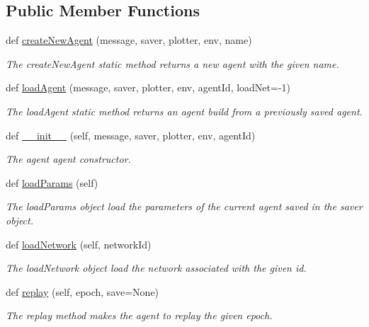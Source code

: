 \subsection*{Public Member Functions}
\begin{DoxyCompactItemize}
\item 
def \hyperlink{classDQN-Deepmind-NIPS-2013_1_1agent_1_1DeepMindAgent_1_1DeepMindAgent_a9ea279d64a3b2bced6901c55df78c7e4}{create\+New\+Agent} (message, saver, plotter, env, name)
\begin{DoxyCompactList}\small\item\em The create\+New\+Agent static method returns a new agent with the given name. \end{DoxyCompactList}\item 
def \hyperlink{classDQN-Deepmind-NIPS-2013_1_1agent_1_1DeepMindAgent_1_1DeepMindAgent_ada9bf3a5f6669e9fbde8d6527511685d}{load\+Agent} (message, saver, plotter, env, agent\+Id, load\+Net=-\/1)
\begin{DoxyCompactList}\small\item\em The load\+Agent static method returns an agent build from a previously saved agent. \end{DoxyCompactList}\item 
def \hyperlink{classDQN-Deepmind-NIPS-2013_1_1agent_1_1DeepMindAgent_1_1DeepMindAgent_a8bbe0f1127879b400142d5cf6fea5384}{\+\_\+\+\_\+init\+\_\+\+\_\+} (self, message, saver, plotter, env, agent\+Id)
\begin{DoxyCompactList}\small\item\em The agent agent constructor. \end{DoxyCompactList}\item 
def \hyperlink{classDQN-Deepmind-NIPS-2013_1_1agent_1_1DeepMindAgent_1_1DeepMindAgent_ae3b30ec9438fbaa91c440415e43844fe}{load\+Params} (self)
\begin{DoxyCompactList}\small\item\em The load\+Params object load the parameters of the current agent saved in the saver object. \end{DoxyCompactList}\item 
def \hyperlink{classDQN-Deepmind-NIPS-2013_1_1agent_1_1DeepMindAgent_1_1DeepMindAgent_a63ce7439d1d1989c262489e08e04e204}{load\+Network} (self, network\+Id)
\begin{DoxyCompactList}\small\item\em The load\+Network object load the network associated with the given id. \end{DoxyCompactList}\item 
def \hyperlink{classDQN-Deepmind-NIPS-2013_1_1agent_1_1DeepMindAgent_1_1DeepMindAgent_af6fed7cfbd89dfe3e1d625842e9364de}{replay} (self, epoch, save=None)
\begin{DoxyCompactList}\small\item\em The replay method makes the agent to replay the given epoch. \end{DoxyCompactList}\end{DoxyCompactItemize}
